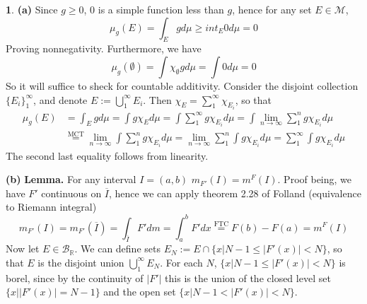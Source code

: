 \documentclass[10.5pt]{article}
\theoremstyle{definition}
\newtheorem{pb}{}
\newcommand{\set}[1]{\{#1\}}
\newcommand{\abs}[1]{\lvert#1\rvert}
\begin{document}
\begin{pb}
    \textbf{(a)} Since \(g \geq 0\), \(0\) is a simple function less than \(g\), hence for any set \(E \in \mathcal{M}\),
    \[\mu_g(E) = \int_E g d\mu \geq int_E 0 d\mu = 0\]
    Proving nonnegativity. Furthermore, we have \[\mu_g(\emptyset) = \int \chi_\emptyset g d\mu = \int 0 d\mu = 0\]
    So it will suffice to sheck for countable additivity. Consider the disjoint collection \(\set{E_i}_1^\infty\), and denote \(E := \bigcup_1^\infty E_i\).
    Then \(\chi_E = \sum_1^\infty \chi_{E_i}\), so that
    \begin{align*}
        \mu_g(E) &= \int_E gd\mu = \int g\chi_E d\mu = \int \sum_1^\infty g \chi_{E_i} d\mu = \int \lim_{n\to\infty} \sum_1^n g \chi_{E_i} d\mu \\
    &\overset{\text{MCT}}{=} \lim_{n\to\infty}\int \sum_1^n g\chi_{E_i}d\mu = \lim_{n\to\infty} \sum_1^n \int g\chi_{E_i}d\mu = \sum_1^\infty \int g\chi_{E_i}d\mu
\end{align*}
    The second last equality follows from linearity.

    \textbf{(b)}
    \textbf{Lemma.} For any interval \(I = (a,b)\) \(m_{F'}(I) = m^F(I)\). Proof being, we have \(F'\) continuous on \(\overline{I}\), hence we can apply theorem 2.28 of Folland (equivalence to Riemann integral)
    \[m_{F'}(I) = m_{F'}(\overline{I}) = \int_{\overline{I}} F' dm = \int_a^b F' dx \overset{\text{FTC}}{=} F(b) - F(a) = m^F(I)\]
    Now let \(E \in \mathcal{B}_\mathbb{R}\). We can define sets \(E_N := E \cap \set{x \vert N - 1 \leq \abs{F'(x)} < N}\), so that \(E\) is the disjoint union \(\bigcup_1^\infty E_N\). For each \(N\),
    \(\set{x \vert N - 1 \leq \abs{F'(x)} < N}\) is borel, since by the continuity of \(\abs{F'}\) this is the union of the closed level set \(\set{x \vert \abs{F'(x)} = N-1}\) and the open set 
    \(\set{x \vert N-1 < \abs{F'(x)} < N}\).
    

\end{pb}
\end{document}
